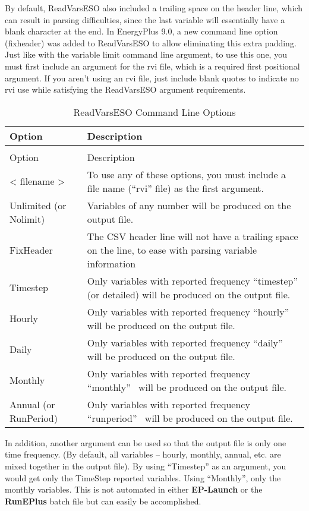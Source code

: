 By default, ReadVarsESO also included a trailing space on the header line, which can result in parsing difficulties, since the last variable will essentially have a blank character at the end.  In EnergyPlus 9.0, a new command line option (fixheader) was added to ReadVarsESO to allow eliminating this extra padding.  Just like with the variable limit command line argument, to use this one, you must first include an argument for the rvi file, which is a required first positional argument.  If you aren't using an rvi file, just include blank quotes to indicate no rvi use while satisfying the ReadVarsESO argument requirements.

\begin{longtable}[c]{p{1.5in}p{4.5in}}
\caption{ReadVarsESO Command Line Options \label{table:readvarseso-command-line-options}} \tabularnewline
\toprule
Option & Description \tabularnewline
\midrule
\endfirsthead

\caption[]{ReadVarsESO Command Line Options} \tabularnewline
\toprule
Option & Description \tabularnewline
\midrule
\endhead

< filename > & To use any of these options, you must include a file name (“rvi” file) as the first argument. \tabularnewline
Unlimited (or Nolimit) & Variables of any number will be produced on the output file. \tabularnewline
FixHeader & The CSV header line will not have a trailing space on the line, to ease with parsing variable information \tabularnewline
Timestep & Only variables with reported frequency “timestep” (or detailed) will be produced on the output file. \tabularnewline
Hourly & Only variables with reported frequency “hourly”~ will be produced on the output file. \tabularnewline
Daily & Only variables with reported frequency “daily”~ will be produced on the output file. \tabularnewline
Monthly & Only variables with reported frequency “monthly”~ will be produced on the output file. \tabularnewline
Annual (or RunPeriod) & Only variables with reported frequency “runperiod”~ will be produced on the output file. \tabularnewline
\bottomrule
\end{longtable}

In addition, another argument can be used so that the output file is only one time frequency. (By default, all variables -- hourly, monthly, annual, etc. are mixed together in the output file). By using ``Timestep'' as an argument, you would get only the TimeStep reported variables. Using ``Monthly'', only the monthly variables. This is not automated in either \textbf{EP-Launch} or the \textbf{RunEPlus} batch file but can easily be accomplished.

